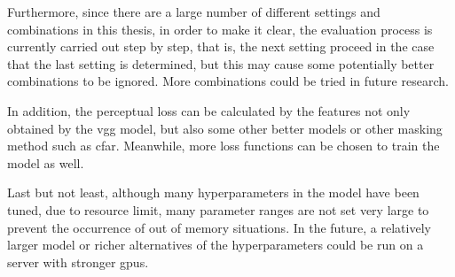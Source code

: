 Furthermore, since there are a large number of different settings and combinations in this thesis, in order to make it clear, the evaluation process is currently carried out step by step, that is, the next setting proceed in the case that the last setting is determined, but this may cause some potentially better combinations to be ignored. More combinations could be tried in future research.

In addition, the perceptual loss can be calculated by the features not only obtained by the \gls{vgg} model, but also some other better models or other masking method such as \gls{cfar}. Meanwhile, more loss functions can be chosen to train the model as well.

Last but not least, although many hyperparameters in the model have been tuned, due to resource limit, many parameter ranges are not set very large to prevent the occurrence of out of memory situations. In the future, a relatively larger model or richer alternatives of the hyperparameters could be run on a server with stronger \gls{gpu}s.

